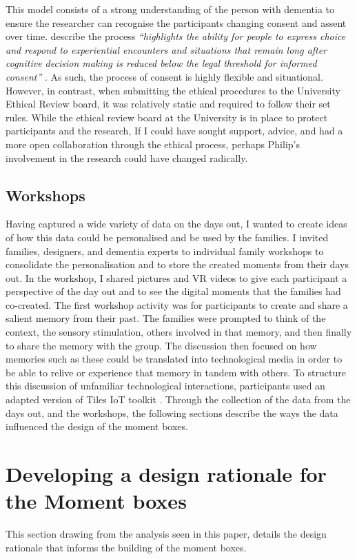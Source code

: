 This model consists of a strong understanding of the person with dementia to ensure the researcher can recognise the participants changing consent and assent over time. \cite{haraldsdottir2019relational} describe the process \textit{``highlights the ability for people to express choice and respond to experiential encounters and situations that remain long after cognitive decision making is reduced below the legal threshold for informed consent''} \citep[pg. 4]{haraldsdottir2019relational}. As such, the process of consent is highly flexible and situational. However, in contrast, when submitting the ethical procedures to the University Ethical Review board, it was relatively static and required to follow their set rules. While the ethical review board at the University is in place to protect participants and the research, If I could have sought support, advice, and had a more open collaboration through the ethical process, perhaps Philip's involvement in the research could have changed radically.

\subsection{Workshops}
\label{workshops}
Having captured a wide variety of data on the days out, I wanted to create ideas of how this data could be personalised and be used by the families. I invited families, designers, and dementia experts to individual family workshops to consolidate the personalisation and to store the created moments from their days out. In the workshop, I shared pictures and VR videos to give each participant a perspective of the day out and to see the digital moments that the families had co-created. The first workshop activity was for participants to create and share a salient memory from their past. The families were prompted to think of the context, the sensory stimulation, others involved in that memory, and then finally to share the memory with the group. The discussion then focused on how memories such as these could be translated into technological media in order to be able to relive or experience that memory in tandem with others. To structure this discussion of unfamiliar technological interactions, participants used an adapted version of Tiles IoT toolkit \citep{mora2017tiles}. Through the collection of the data from the days out, and the workshops, the following sections describe the ways the data influenced the design of the moment boxes.


\section{Developing a design rationale for the Moment boxes}
\label{DesignRationale}
This section drawing from the analysis seen in this paper, details the design rationale that informs the building of the moment boxes. 


